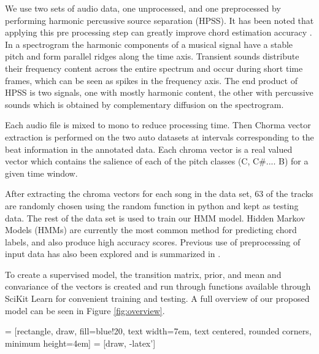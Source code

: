 \documentclass{article}
\begin{document}
We use two sets of audio data, one unprocessed, and one preprocessed by
performing harmonic percussive source separation (HPSS). It has been noted that
applying this pre processing step can greatly improve chord estimation accuracy \cite{Reed:09}.
In a spectrogram the harmonic components of a musical signal have
a stable pitch and form parallel ridges along the time axis. Transient sounds distribute
their frequency content across the entire spectrum and occur during short time frames,
which can be seen as spikes in the frequency axis. The end product of HPSS is two signals,
one with mostly harmonic content, the other with percussive sounds which is obtained by
complementary diffusion on the spectrogram.

Each audio file is mixed to mono to reduce processing time. Then Chorma vector extraction is
performed on the two auto datasets at intervals corresponding to the beat information in the
annotated data. Each chroma vector is a real valued vector which contains the salience of each
of the pitch classes (C, C\#.... B) for a given time window.

After extracting the chroma vectors for each song in the data set, 63 of the tracks are randomly
chosen using the random function in python and kept as testing data. The rest of the data set
is used to train our HMM model. Hidden Markov Models (HMMs) are currently the most common method for
predicting chord labels, and also produce high accuracy scores. Previous use of
preprocessing of input data has also been explored and is summarized in \cite{McVicar:00}.

To create a supervised model, the transition matrix, prior, and mean and convariance of the
vectors is created and run through functions available through
SciKit Learn for convenient training and testing. A full overview of our
proposed model can be seen in Figure \ref{fig:overview}.

 = [rectangle, draw, fill=blue!20,
    text width=7em, text centered, rounded corners, minimum height=4em]
 = [draw, -latex']
\end{document}

